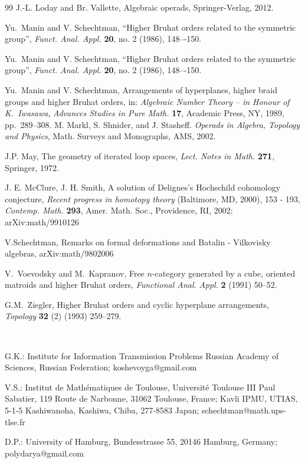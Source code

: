 \documentclass[12pt,a4paper]{article}
\begin{document}
\begin{thebibliography}{99}
 J.-L. Loday and Br. Vallette, Algebraic operads, Springer-Verlag, 2012.   
 
 Yu.~Manin and V. Schechtman, “Higher Bruhat orders related to the symmetric group”, \textsl{Funct. Anal. Appl.} {\bf 20}, no. 2 (1986), 148–-150.

 Yu.~Manin and V. Schechtman, “Higher Bruhat orders related to the symmetric group”, \textsl{Funct. Anal. Appl.} {\bf 20}, no. 2 (1986), 148–-150.

  Yu.~Manin and V. Schechtman, Arrangements of hyperplanes, higher braid groups and higher Bruhat orders, in: \textsl{Algebraic Number Theory -- in Honour of K.~Iwasawa}, \textsl{Advances Studies in Pure Math.} \textbf{17}, Academic Press, NY, 1989, pp.~289--308.
  M. Markl, S. Shnider, and J. Stasheff. {\em Operads in Algebra, Topology and Physics}, Math. Surveys and Monographs, AMS, 2002.
 
  J.P. May, The geometry of iterated loop spaces, {\it Lect. Notes in Math.} {\bf 271}, 
 Springer, 1972. 
 
 J. E. McClure, J. H. Smith, A solution of Delignes's Hochschild cohomology 
conjecture, {\it Recent progress in homotopy theory} (Baltimore, MD, 2000), 153 - 193,
{\it Contemp. Math.} {\bf 293}, Amer. Math. Soc., Providence, RI, 2002;  
arXiv:math/9910126

 V.Schechtman, Remarks on formal deformations and Batalin - Vilkovisky algebras, arXiv:math/9802006 
 
 V.~Voevodsky and M.~Kapranov, Free $n$-category generated by a cube, oriented matroids and higher Bruhat orders, \textsl{Functional Anal. Appl.} \textbf{2} (1991) 50--52.

%

G.M.~Ziegler, Higher Bruhat orders and cyclic hyperplane arrangements,
\textsl{Topology} \textbf{32} (2) (1993) 259--279.






 


\end{thebibliography}

\

G.K.: Institute for Information Transmission Problems Russian Academy of Sciences,
Russian Federation; 
{koshevoyga@gmail.com}

V.S.: Institut de Math\'ematiques de Toulouse, 
Universit\'e Toulouse III Paul Sabatier, 119 Route de Narbonne, 31062 Toulouse, France; 
Kavli IPMU, UTIAS, 5-1-5 Kashiwanoha, Kashiwa, Chiba, 277-8583 Japan; 
{schechtman@math.ups-tlse.fr} 

D.P.: University of Hamburg, Bundesstrasse 55, 20146 Hamburg, Germany; 
{polydarya@gmail.com}
\end{document}
